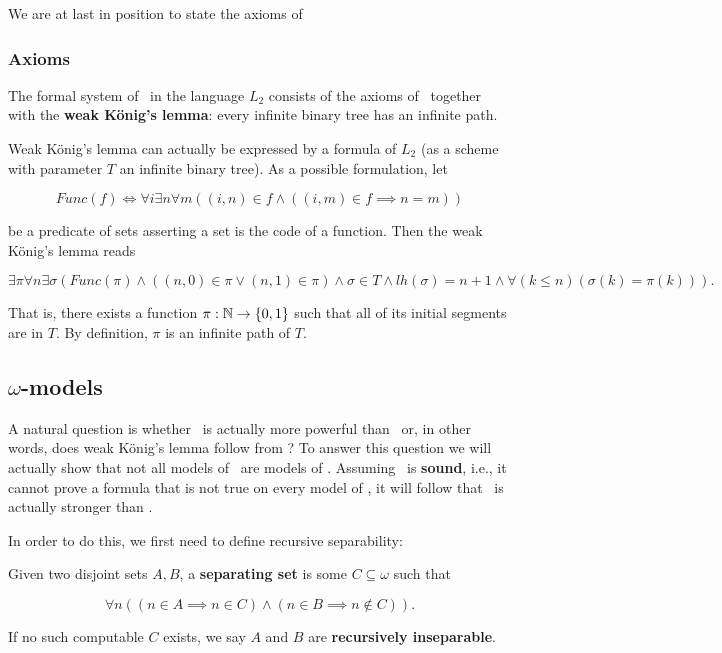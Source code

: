 \documentclass[../main.tex]{memoir}
\begin{document}
We are at last in position to state the axioms of \wkl

\subsubsection{Axioms}

\begin{definition}
  The formal system of \wkl\ in the language $L_2$ consists of the axioms of \rca\ together with the \textbf{weak König's lemma}: every infinite binary tree has an infinite path.
\end{definition}

\begin{remark}
  \label{remark:wkl-formalization}
  Weak König's lemma can actually be expressed by a formula of $L_2$ (as a scheme with parameter $T$ an infinite binary tree). As a possible formulation, let

  \[ Func(f) \iff \forall i \exists n \forall m ((i, n) \in f \land ((i, m) \in f \implies n = m)) \]

  be a predicate of sets asserting a set is the code of a function. Then the weak König's lemma reads

  \[ \exists \pi \forall n \exists \sigma (Func(\pi) \land ((n, 0) \in \pi \lor (n, 1) \in \pi) \land \sigma \in T \land lh(\sigma) = n + 1 \land \forall(k \le n) (\sigma(k) = \pi(k))). \]

  That is, there exists a function $\pi: \mathbb{N} \to \{0, 1\}$ such that all of its initial segments are in $T$. By definition, $\pi$ is an infinite path of $T$.
\end{remark}

\subsection{$\omega$-models}

A natural question is whether \wkl\ is actually more powerful than \rca\ or, in other words, does weak König's lemma follow from \rca? To answer this question we will actually show that not all models of \rca\ are models of \wkl. Assuming \rca\ is \textbf{sound}, i.e., it cannot prove a formula that is not true on every model of \rca, it will follow that \wkl\ is actually stronger than \rca.

In order to do this, we first need to define recursive separability:

\begin{definition}
  Given two disjoint sets $A, B$, a \textbf{separating set} is some $C \subseteq \omega$ such that

  \[ \forall n ((n \in A \implies n \in C) \land (n \in B \implies n \not\in C)). \]

  If no such computable $C$ exists, we say $A$ and $B$ are \textbf{recursively inseparable}.
\end{definition}
\end{document}
